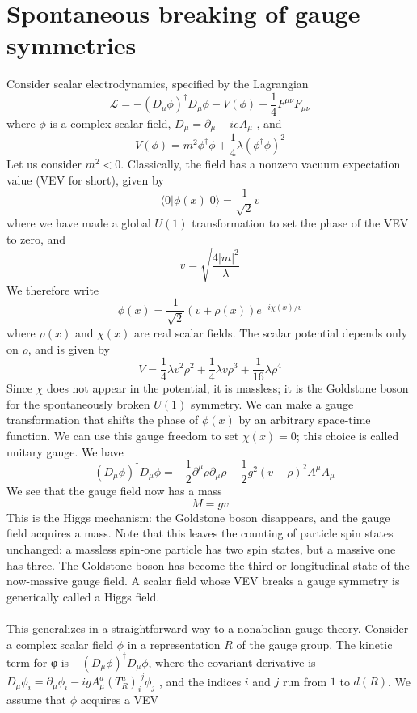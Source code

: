 \section{Spontaneous breaking of gauge symmetries}
Consider scalar electrodynamics, specified by the Lagrangian
\[\mathcal{L} = -(D_{\mu}\phi)^{\dagger}D_{\mu}\phi - V(\phi) - \frac{1}{4}F^{\mu\nu}F_{\mu\nu}\]
where $\phi$ is a complex scalar field, $D_{\mu} = \partial_{\mu} - ieA_{\mu}$ , and
\[V(\phi) = m^2\phi^{\dagger}\phi + \frac{1}{4}\lambda (\phi^{\dagger}\phi)^2\]
Let us consider $m^2 < 0$. Classically, the field has a nonzero vacuum expectation value (VEV for short), given by
\[\langle 0 | \phi(x) | 0 \rangle = \frac{1}{\sqrt{2}}v\]
where we have made a global $U(1)$ transformation to set the phase of the VEV to zero, and
\[v = \sqrt{\frac{4|m|^2}{\lambda}}\]
We therefore write
\[\phi(x) = \frac{1}{\sqrt{2}} (v + \rho(x)) e^{-i\chi(x)/v}\]
where $\rho(x)$ and $\chi(x)$ are real scalar fields. The scalar potential depends only on $\rho$, and is given by
\[V = \frac{1}{4}\lambda v^2\rho^2 + \frac{1}{4}\lambda v \rho^3 + \frac{1}{16}\lambda \rho^4\]
Since $\chi$ does not appear in the potential, it is massless; it is the Goldstone boson for the spontaneously broken $U(1)$ symmetry.
We can make a gauge transformation that shifts the phase of $\phi(x)$ by an arbitrary space-time function.
We can use this gauge freedom to set $\chi(x) = 0$; this choice is called unitary gauge.
We have
\[-(D_{\mu}\phi)^{\dagger}D_{\mu}\phi = -\frac{1}{2}\partial^{\mu}\rho \partial_{\mu}\rho - \frac{1}{2}g^2(v+\rho)^2 A^{\mu}A_{\mu}\]
We see that the gauge field now has a mass
\[M = gv\]
This is the Higgs mechanism: the Goldstone boson disappears, and the gauge field acquires a mass. Note that this leaves the counting of particle spin states unchanged: a massless spin-one particle has two spin states, but a massive
one has three. The Goldstone boson has become the third or longitudinal state of the now-massive gauge field. A scalar field whose VEV breaks a gauge symmetry is generically called a Higgs field.
\\ \\
This generalizes in a straightforward way to a nonabelian gauge theory. Consider a complex scalar field $\phi$ in a representation $R$ of the gauge group.
The kinetic term for φ is $-(D_{\mu}\phi)^{\dagger}D_{\mu}\phi$, where the covariant derivative is $D_{\mu}\phi_i = \partial_{\mu}\phi_i - igA^a_{\mu}(T^a_R)_{i}^{\phantom{i}j} \phi_j$ , and the indices $i$ and $j$ run from $1$ to $d(R)$.
We assume that $\phi$ acquires a VEV
